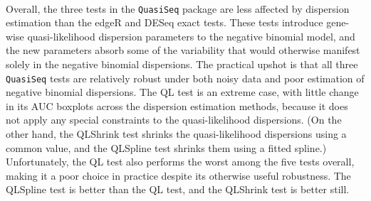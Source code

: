 \documentclass[10pt]{article}
\begin{document}
%

{\color{blue}
\paragraph{} \indent Overall, the three tests in the {\tt QuasiSeq} package are less affected by dispersion estimation than the edgeR and DESeq exact tests. These tests introduce gene-wise quasi-likelihood dispersion parameters to the negative binomial model, and the new parameters absorb some of the variability that would otherwise manifest solely in the negative binomial dispersions. The practical upshot is that all three {\tt QuasiSeq} tests are relatively robust under both noisy data and poor estimation of negative binomial dispersions. The QL test is an extreme case, with little change in its AUC boxplots across the dispersion estimation methods, because it does not apply any special constraints to the quasi-likelihood dispersions. (On the other hand, the QLShrink test shrinks the quasi-likelihood dispersions using a common value, and the QLSpline test shrinks them using a fitted spline.) Unfortunately, the QL test also performs the worst among the five tests overall, making it a poor choice in practice despite its otherwise useful robustness. The QLSpline test is better than the QL test, and the QLShrink test is better still. }
\end{document}
